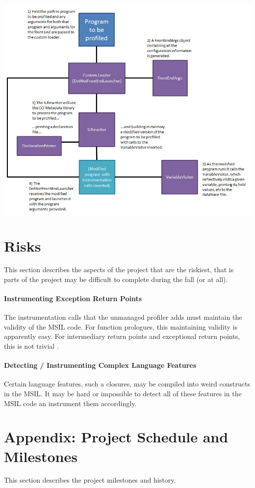 \documentclass{article}
\begin{document}
\includegraphics[scale=.7]{SequenceDiagram.jpg}

\section{Risks}
This section describes the aspects of the project that are the riskiest, that is parts of the project may be difficult to complete during the fall (or at all).

\paragraph{Instrumenting Exception Return Points}
The instrumentation calls that the unmanaged profiler adds must maintain the validity of the MSIL code. For function prologues, this maintaining validity is apparently easy. For intermediary return points and exceptional return points, this is not trivial \cite{Mikunov:2003:Online}.

\paragraph{Detecting / Instrumenting Complex Language Features}
Certain language features, such a closures, may be compiled into weird
constructs in the MSIL. It may be hard or impossible to detect all of
these features in the MSIL code an instrument them accordingly.

\appendix

\section{Appendix: Project Schedule and Milestones}
This section describes the project milestones and history.
\end{document}
